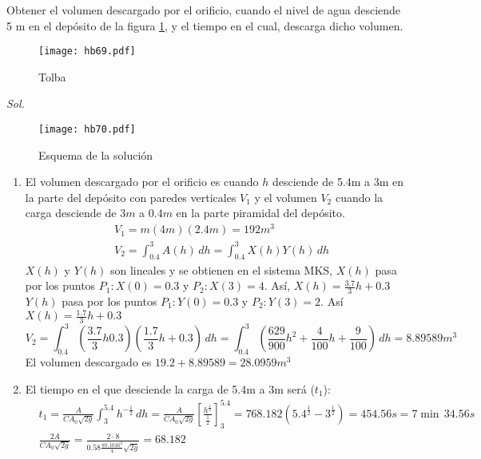 \begin{example}
    Obtener el volumen descargado por el orificio, cuando el nivel de agua desciende 5 m en el depósito de la figura \ref{hb69}, y el tiempo en el cual, descarga dicho volumen.
\end{example}
\begin{figure}[h!]
\centering
  \texttt{[image: hb69.pdf]}
  \caption{Tolba}
  \label{hb69}
\end{figure}

\textit{ Sol. }

\begin{figure}[h!]
\centering
  \texttt{[image: hb70.pdf]}
  \caption{Esquema de la solución}
  \label{hb70}
\end{figure}

\begin{enumerate}
    \item El volumen descargado por el orificio es cuando $h$ desciende de 5.4m a 3m en la parte del depósito con paredes verticales $V_1$ y el volumen $V_2$ cuando la carga desciende de $3m$ a $0.4m$ en la parte piramidal del depósito.
    \begin{align*}
        &V_1 = m(4m)(2.4m) =192m^3\\
        &V_2 =\int_{0.4}^{3} A(h)\,dh = \int_{0.4}^{3}X(h)Y(h)\,dh
    \end{align*}
    $X(h)$ y $Y(h)$ son lineales y se obtienen en el sistema MKS, $X(h)$ pasa por los puntos $P_1:X(0)=0.3$ y $P_2:X(3)=4$. Así, $X(h)= \frac{3.7}{3}h+0.3$
    $Y(h)$ pasa por los puntos $P_1:Y(0)=0.3$ y $P_2:Y(3)=2$. Así $X(h)= \frac{1.7}{3}h+0.3$
    \begin{equation*}
        V_2 = \int_{0.4}^{3}\left(\frac{3.7}{3}h 0.3\right)\left(\frac{1.7}{3}h +0.3\right)\,dh = \int_{0.4}^{3}\left(\frac{629}{900}h^2 + \frac{4}{100}h + \frac{9}{100}\right)\,dh = 8.89589m^3
    \end{equation*}
    El volumen descargado es $19.2+8.89589=28.0959m^3$    
    \item El tiempo en el que desciende la carga de 5.4m a 3m será ($t_1$):
    \begin{align*}
        &t_1 = \frac{A}{CA_0 \sqrt{2g}}\int_3^{5.4}h^{ -\frac{1}{2}}\,dh = \frac{A}{CA_0 \sqrt{2g}}\left[\frac{h^{\frac{1}{2}}}{\frac{1}{2}} \right]_3^{5.4} = 768.182\left(5.4^{\frac{1}{2}} - 3^{\frac{1}{2}}\right) =454.56s = 7\min \, 34.56s\\
        &\frac{2A}{CA_0 \sqrt{2g}} =\frac{2\cdot 8}{0.58 \frac{\pi 0.1016^2}{4} \sqrt{2g}} = 68.182 

\end{align*}
\end{enumerate}
